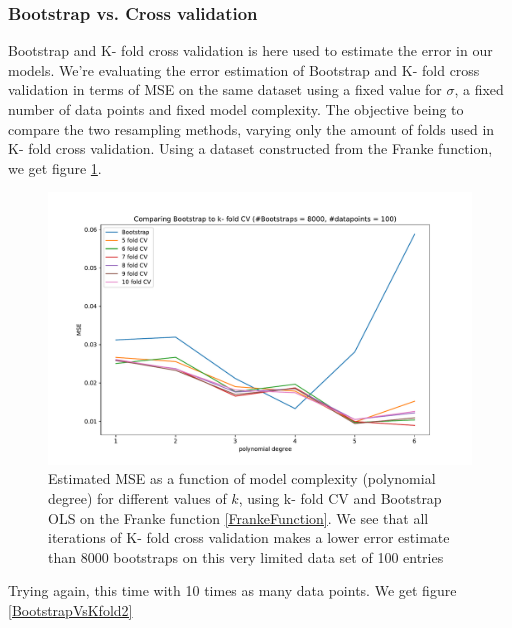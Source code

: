 \documentclass[11pt,a4paper,titlepage]{article}
\begin{document}
\subsubsection{Bootstrap vs. Cross validation}
Bootstrap and K- fold cross validation is here used to estimate the error in our models. We're evaluating the error estimation of Bootstrap and K- fold cross validation in terms of MSE on the same dataset using a fixed value for $\sigma$, a fixed number of data points and fixed model complexity. The objective being to compare the two resampling methods, varying only the amount of folds used in K- fold cross validation. Using a dataset constructed from the Franke function, we get figure \ref{BootstrapVsKfold1}.

\begin{figure}[H]
\centering

\includegraphics[trim=1.4cm 0.2cm 2.5cm 1.2cm, clip=true,scale = 0.5]{KfoldVsBootstrap_k5to10_8kBootstraps.pdf}
\caption[Comparing Error estimates from Bootstrap vs. K- fold CV]{Estimated MSE as a function of model complexity (polynomial degree) for different values of $k$, using k- fold CV and Bootstrap OLS on the Franke function \eqref{FrankeFunction}. We see that all iterations of K- fold cross validation makes a lower error estimate than 8000 bootstraps on this very limited data set of 100 entries}\label{BootstrapVsKfold1}
\end{figure}
Trying again, this time with 10 times as many data points. We get figure \ref{BootstrapVsKfold2}
\end{document}
